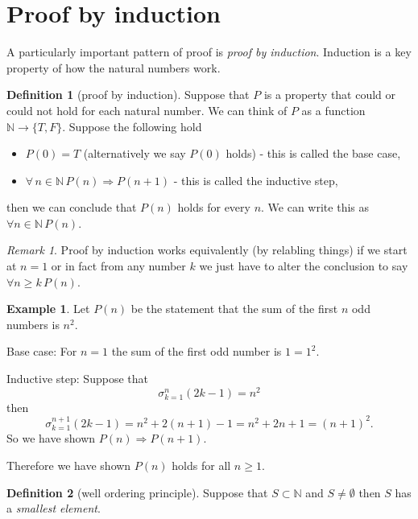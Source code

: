 \documentclass[
]{book}
\theoremstyle{definition}
\newtheorem{definition}{Definition}[chapter]
\theoremstyle{definition}
\newtheorem{example}{Example}[chapter]
\theoremstyle{definition}
\theoremstyle{definition}
\theoremstyle{remark}
\newtheorem*{remark}{Remark}
\begin{document}
\section{Proof by induction}\label{proof-by-induction}

A particularly important pattern of proof is \emph{proof by induction}. Induction is a key property of how the natural numbers work.

\begin{definition}[proof by induction]
Suppose that \(P\) is a property that could or could not hold for each natural number. We can think of \(P\) as a function \(\mathbb{N}\rightarrow \{T,F\}\). Suppose the following hold

\begin{itemize}
\item
  \(P(0)=T\) (alternatively we say \(P(0)\) holds) - this is called the base case,
\item
  \(\forall \, n \in \mathbb{N} \, P(n) \Rightarrow P(n+1)\) - this is called the inductive step,
\end{itemize}

then we can conclude that \(P(n)\) holds for every \(n\). We can write this as \(\forall n \in \mathbb{N} \, P(n)\).
\end{definition}

\begin{remark}
Proof by induction works equivalently (by relabling things) if we start at \(n=1\) or in fact from any number \(k\) we just have to alter the conclusion to say \(\forall n \geq k \, P(n)\).
\end{remark}

\begin{example}
Let \(P(n)\) be the statement that the sum of the first \(n\) odd numbers is \(n^2\).

Base case: For \(n=1\) the sum of the first odd number is \(1 = 1^2\).

Inductive step: Suppose that \[ \sigma_{k=1}^n (2k-1) = n^2 \] then
\[ \sigma_{k=1}^{n+1} (2k-1) = n^2 + 2(n+1) -1 = n^2 +2n +1 = (n+1)^2.  \] So we have shown \(P(n) \Rightarrow P(n+1)\).

Therefore we have shown \(P(n)\) holds for all \(n \geq 1\).
\end{example}

\begin{definition}[well ordering principle]
Suppose that \(S \subset \mathbb{N}\) and \(S \neq \emptyset\) then \(S\) has a \emph{smallest element}.
\end{definition}
\end{document}
